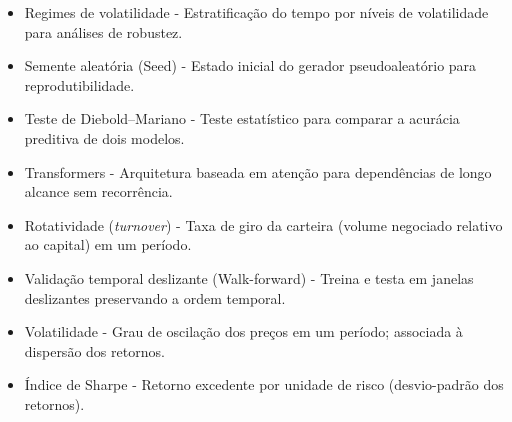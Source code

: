 \begin{itemize}
\item {Regimes de volatilidade} - Estratificação do tempo por níveis de volatilidade para análises de robustez.
\item {Semente aleatória (Seed)} - Estado inicial do gerador pseudoaleatório para reprodutibilidade.
\item {Teste de Diebold–Mariano} - Teste estatístico para comparar a acurácia preditiva de dois modelos.
\item {Transformers} - Arquitetura baseada em atenção para dependências de longo alcance sem recorrência.
\item {Rotatividade (\textit{turnover})} - Taxa de giro da carteira (volume negociado relativo ao capital) em um período.
\item {Validação temporal deslizante (Walk-forward)} - Treina e testa em janelas deslizantes preservando a ordem temporal.
\item {Volatilidade} - Grau de oscilação dos preços em um período; associada à dispersão dos retornos.
\item {Índice de Sharpe} - Retorno excedente por unidade de risco (desvio-padrão dos retornos).




\end{itemize}
